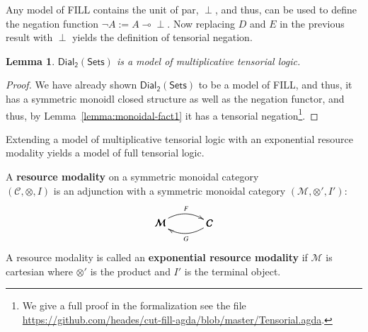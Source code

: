 \documentclass[preprint,12pt]{elsarticle}
\newcommand{\cat}[1]{\mathcal{#1}}
\newcommand{\limp}[0]{\multimap}
\newcommand{\dial}[0]{\mathsf{Dial_2}(\mathsf{Sets})}
\newtheorem{lemma}[theorem]{Lemma}
\begin{document}
Any model of FILL contains the unit of par, $\perp$, and thus, can be
used to define the negation function $\lnot A := A \limp \perp$.  Now
replacing $D$ and $E$ in the previous result with $\perp$ yields the
definition of tensorial negation.
\begin{lemma}
  \label{lemma:dial-tensorial}
  $\dial$ is a model of multiplicative tensorial logic.
\end{lemma}
\begin{proof}
  We have already shown $\dial$ to be a model of FILL, and thus, it has a
  symmetric monoidl closed structure as well as the negation functor, and thus, by
  Lemma~\ref{lemma:monoidal-fact1} it has a tensorial
  negation\footnote{We give a full proof in the formalization see the
    file
    \url{https://github.com/heades/cut-fill-agda/blob/master/Tensorial.agda}.}.
\end{proof}

Extending a model of multiplicative tensorial logic with an exponential
resource modality yields a model of full tensorial logic.
\begin{definition}
  \label{def:resource-modality}
  A \textbf{resource modality} on a symmetric monoidal category\\
  $(\cat{C}, \otimes, I)$ is an adjunction with a symmetric monoidal
  category $(\cat{M}, \otimes', I')$:
  \[
  \bfig
  \morphism(0,0)|a|/{@{>}@/^1em/}/<500,0>[\cat{M}`\cat{C};F]
  \morphism(0,0)|b|/{@{<-}@/_1em/}/<500,0>[\cat{M}`\cat{C};G]
  \efig
  \]
  A resource modality is called an \textbf{exponential resource
    modality} if $\cat{M}$ is cartesian where $\otimes'$ is the
  product and $I'$ is the terminal object.
\end{definition}
\end{document}
